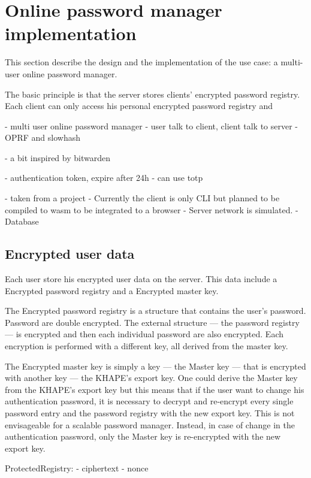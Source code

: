 \documentclass[../report.tex]{subfiles}
\begin{document}
\section{Online password manager implementation}

This section describe the design and the implementation of the use case: a multi-user online password manager.

The basic principle is that the server stores clients' encrypted password registry. 
Each client can only access his personal encrypted password registry and 

- multi user online password manager
- user talk to client, client talk to server
- OPRF and slowhash

- a bit inspired by bitwarden

- authentication token, expire after 24h
- can use totp


- taken from a project 
- Currently the client is only CLI but planned to be compiled to wasm to be integrated to a browser
- Server network is simulated.
- Database



\subsection{Encrypted user data}
Each user store his encrypted user data on the server. This data include a Encrypted password registry and a Encrypted master key.


The Encrypted password registry is a structure that contains the user's password. Password are double encrypted. The external structure --- the password registry --- is encrypted and then each individual password are also encrypted. Each encryption is performed with a different key, all derived from the master key.

The Encrypted master key is simply a key --- the Master key --- that is encrypted with another key --- the KHAPE's export key. 
One could derive the Master key from the KHAPE's export key but this means that if the user want to change his authentication password, it is necessary to decrypt and re-encrypt every single password entry and the password registry with the new export key. This is not envisageable for a scalable password manager. Instead, in case of change in the authentication password, only the Master key is re-encrypted with the new export key.


ProtectedRegistry:
- ciphertext
- nonce
\end{document}
